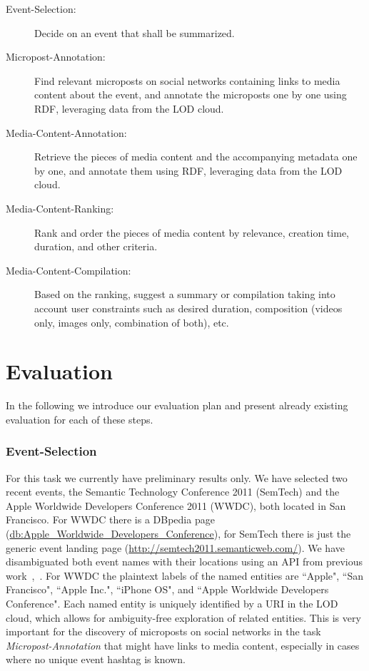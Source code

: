 \documentclass[runningheads,a4paper]{llncs}
\begin{document}
\begin{description}
\item [Event-Selection:] Decide on an event that shall be summarized.
\item [Micropost-Annotation:] Find relevant microposts on social networks containing links to media content about the event, and annotate the microposts one by one using RDF, leveraging data from the LOD cloud.
\item [Media-Content-Annotation:] Retrieve the pieces of media content and the accompanying metadata one by one, and annotate them using RDF, leveraging data from the LOD cloud.
\item [Media-Content-Ranking:] Rank and order the pieces of media content by relevance, creation time, duration, and other criteria.
\item [Media-Content-Compilation:] Based on the ranking, suggest a summary or compilation taking into account user constraints such as desired duration, composition (videos only, images only, combination of both), etc.
\end{description}

\section{Evaluation}
In the following we introduce our evaluation plan and present already existing evaluation for each of these steps.

\subsubsection{Event-Selection}
For this task we currently have preliminary results only. We have selected two recent events, the Semantic Technology Conference 2011 (SemTech) and the Apple Worldwide Developers Conference 2011 (WWDC), both located in San Francisco. For WWDC there is a DBpedia page (\url{db:Apple_Worldwide_Developers_Conference}), for SemTech there is just the generic event landing page (\url{http://semtech2011.semanticweb.com/}). We have disambiguated both event names with their locations using an API from previous work~\cite{twittertrends},~\cite{semwebvid}. For WWDC the plaintext labels of the named entities are ``Apple", ``San Francisco", ``Apple Inc.", ``iPhone OS", and ``Apple Worldwide Developers Conference". Each named entity is uniquely identified by a URI in the LOD cloud, which allows for ambiguity-free exploration of related entities. This is very important for the discovery of microposts on social networks in the task \emph{Micropost-Annotation} that might have links to media content, especially in cases where no unique event hashtag is known.
\end{document}
